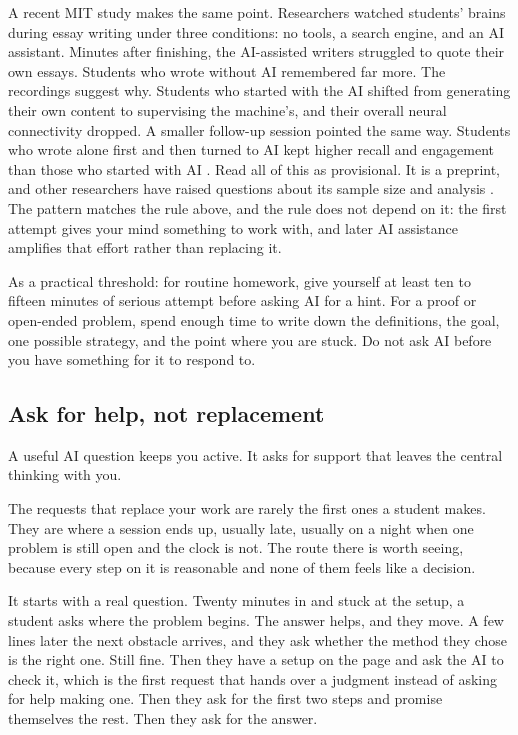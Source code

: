 \documentclass{SIAMbook2023}
\begin{document}
A recent MIT study makes the same point. Researchers watched students' brains during essay writing under three conditions: no tools, a search engine, and an AI assistant. Minutes after finishing, the AI-assisted writers struggled to quote their own essays. Students who wrote without AI remembered far more. The recordings suggest why. Students who started with the AI shifted from generating their own content to supervising the machine's, and their overall neural connectivity dropped. A smaller follow-up session pointed the same way. Students who wrote alone first and then turned to AI kept higher recall and engagement than those who started with AI \citep{kosmyna2025brain}. Read all of this as provisional. It is a preprint, and other researchers have raised questions about its sample size and analysis \citep{stankovic2026comment}. The pattern matches the rule above, and the rule does not depend on it: the first attempt gives your mind something to work with, and later AI assistance amplifies that effort rather than replacing it.

As a practical threshold: for routine homework, give yourself at least ten to fifteen minutes of serious attempt before asking AI for a hint. For a proof or open-ended problem, spend enough time to write down the definitions, the goal, one possible strategy, and the point where you are stuck. Do not ask AI before you have something for it to respond to.

\subsection{Ask for help, not replacement}
\label{subsec:ask-for-help}%

A useful AI question keeps you active. It asks for support that leaves the central thinking with you.

The requests that replace your work are rarely the first ones a student makes. They are where a session ends up, usually late, usually on a night when one problem is still open and the clock is not. The route there is worth seeing, because every step on it is reasonable and none of them feels like a decision.

It starts with a real question. Twenty minutes in and stuck at the setup, a student asks where the problem begins. The answer helps, and they move. A few lines later the next obstacle arrives, and they ask whether the method they chose is the right one. Still fine. Then they have a setup on the page and ask the AI to check it, which is the first request that hands over a judgment instead of asking for help making one. Then they ask for the first two steps and promise themselves the rest. Then they ask for the answer.
\end{document}
